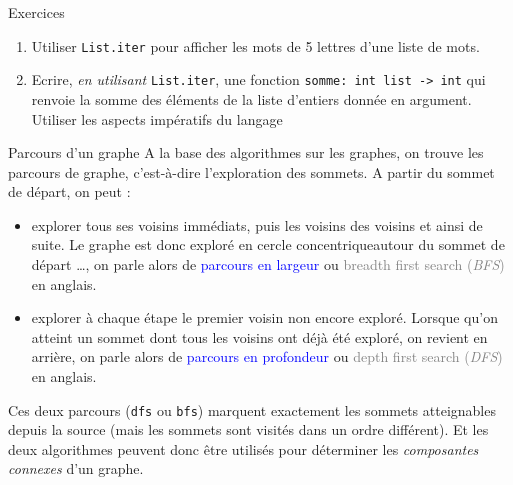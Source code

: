 \documentclass[10pt]{beamer}
\begin{document}
\begin{frame}[fragile]{\Ctitle}{\stitle}
	\begin{exampleblock}{Exercices}
		\begin{enumerate}
			\item<1-> Utiliser {\tt List.iter} pour afficher les mots de 5 lettres d'une liste de mots.
			\item<2-> Ecrire, \textit{en utilisant} \texttt{List.iter}, une fonction {\tt somme: int list -> int} qui renvoie la somme des éléments de la liste d'entiers donnée en argument. \\
			\textcolor{OliveGreen}{\small \aide \;} Utiliser les aspects impératifs du langage
		\end{enumerate}
	\end{exampleblock}
\end{frame}

\begin{frame}[fragile]{\Ctitle}{\stitle}
	\begin{block}{Parcours d'un graphe}
		A la base des algorithmes sur les graphes, on trouve les parcours de graphe, c'est-à-dire l'exploration des sommets. A partir du sommet de départ, on peut :
		\begin{itemize}
			\item<2-> explorer tous ses voisins immédiats, puis les voisins des voisins et ainsi de suite. Le graphe est donc exploré en \og cercle concentrique\fg autour du sommet de départ  \dots, on parle alors de  \textcolor{blue}{parcours en largeur} ou \textcolor{gray}{breadth first search (\textit{BFS})} en anglais.
			\item<3-> explorer à chaque étape le premier voisin non encore exploré. Lorsque qu'on atteint un sommet dont tous les voisins ont déjà été exploré, on revient en arrière, on parle alors de  \textcolor{blue}{parcours en profondeur} ou \textcolor{gray}{depth first search (\textit{DFS})} en anglais.
		\end{itemize}
		Ces deux parcours ({\tt dfs} ou {\tt bfs}) marquent exactement les sommets atteignables depuis la source (mais les sommets sont visités dans un ordre différent). Et les deux algorithmes peuvent donc être utilisés pour déterminer les \textit{composantes connexes} d'un graphe.
	\end{block}
\end{frame}
\end{document}
